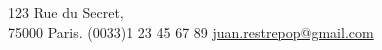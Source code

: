     {123 Rue du Secret,\\75000 Paris.}
    {(0033)1 23 45 67 89}
    {\url{juan.restrepop@gmail.com}}